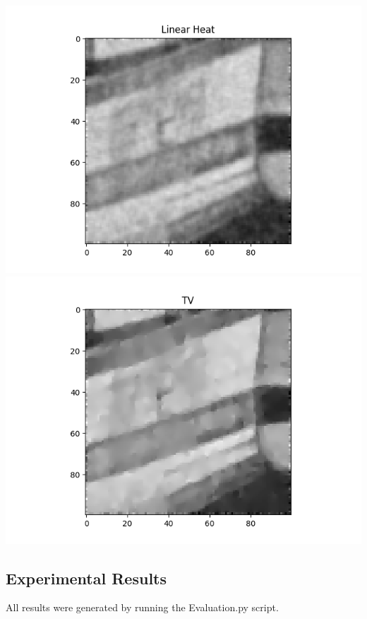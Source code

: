 \documentclass{article}
\begin{document}
  \newpage
  \begin{center}
    \includegraphics[width=\textwidth]{../generated_images/LinearHeat_test1.png}
    \includegraphics[width=\textwidth]{../generated_images/TV_test1.png}
  \end{center}

  \newpage
  \subsection{Experimental Results}
  All results were generated by running the Evaluation.py script.\\
\end{document}
